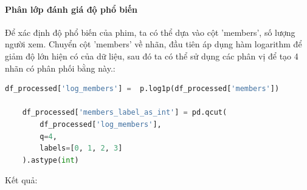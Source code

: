     \FloatBarrier

    \paragraph{Phân lớp đánh giá độ phổ biến}
    \leavevmode

    Để xác định độ phổ biến của phim, ta có thể dựa vào cột 'members', số lượng người xem. Chuyển cột 'members' về nhãn, đầu tiên áp dụng hàm logarithm để giảm độ lớn hiện có của dữ liệu, sau đó ta có thể sử dụng các phân vị để tạo 4 nhãn có phân phối bằng này.:

    \begin{lstlisting}[language=Python]
    df_processed['log_members'] =  p.log1p(df_processed['members'])
    
    df_processed['members_label_as_int'] = pd.qcut(
        df_processed['log_members'],
        q=4,
        labels=[0, 1, 2, 3]
    ).astype(int)
    \end{lstlisting}

    Kết quả:

